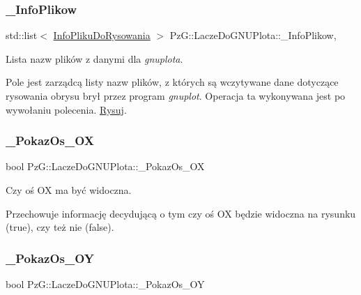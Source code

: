 \subsubsection{\texorpdfstring{\+\_\+\+Info\+Plikow}{\_InfoPlikow}}
{\footnotesize\ttfamily std\+::list$<$ \hyperlink{classPzG_1_1InfoPlikuDoRysowania}{Info\+Pliku\+Do\+Rysowania} $>$ Pz\+G\+::\+Lacze\+Do\+G\+N\+U\+Plota\+::\+\_\+\+Info\+Plikow\hspace{0.3cm}{\ttfamily [static]}, {\ttfamily [protected]}}



Lista nazw plików z danymi dla {\itshape gnuplota}. 

Pole jest zarządcą listy nazw plików, z których są wczytywane dane dotyczące rysowania obrysu brył przez program {\itshape gnuplot}. Operacja ta wykonywana jest po wywołaniu polecenia. \hyperlink{classPzG_1_1LaczeDoGNUPlota_a065f5b8402737cc62b0ad4f66d028335}{Rysuj}. \mbox{\label{classPzG_1_1LaczeDoGNUPlota_a833aa8994b9913786f920ec8c259731f}} 
\subsubsection{\texorpdfstring{\+\_\+\+Pokaz\+Os\+\_\+\+OX}{\_PokazOs\_OX}}
{\footnotesize\ttfamily bool Pz\+G\+::\+Lacze\+Do\+G\+N\+U\+Plota\+::\+\_\+\+Pokaz\+Os\+\_\+\+OX\hspace{0.3cm}{\ttfamily [protected]}}



Czy oś OX ma być widoczna. 

Przechowuje informację decydującą o tym czy oś OX będzie widoczna na rysunku ({\ttfamily true}), czy też nie ({\ttfamily false}). \mbox{\label{classPzG_1_1LaczeDoGNUPlota_ae8d9b4dac5eae6ce86b7043c45b70ed8}} 
\subsubsection{\texorpdfstring{\+\_\+\+Pokaz\+Os\+\_\+\+OY}{\_PokazOs\_OY}}
{\footnotesize\ttfamily bool Pz\+G\+::\+Lacze\+Do\+G\+N\+U\+Plota\+::\+\_\+\+Pokaz\+Os\+\_\+\+OY\hspace{0.3cm}{\ttfamily [protected]}}



